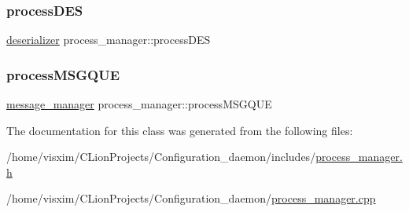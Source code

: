 \subsubsection{\texorpdfstring{process\+D\+ES}{processDES}}
{\footnotesize\ttfamily \hyperlink{classdeserializer}{deserializer} process\+\_\+manager\+::process\+D\+ES}

\mbox{\label{classprocess__manager_ab2ca0fdbd1a2975edd1b3f78b5f1f20c}} 
\subsubsection{\texorpdfstring{process\+M\+S\+G\+Q\+UE}{processMSGQUE}}
{\footnotesize\ttfamily \hyperlink{classmessage__manager}{message\+\_\+manager} process\+\_\+manager\+::process\+M\+S\+G\+Q\+UE}



The documentation for this class was generated from the following files\+:\begin{DoxyCompactItemize}
\item 
/home/visxim/\+C\+Lion\+Projects/\+Configuration\+\_\+daemon/includes/\hyperlink{process__manager_8h}{process\+\_\+manager.\+h}\item 
/home/visxim/\+C\+Lion\+Projects/\+Configuration\+\_\+daemon/\hyperlink{process__manager_8cpp}{process\+\_\+manager.\+cpp}\end{DoxyCompactItemize}
